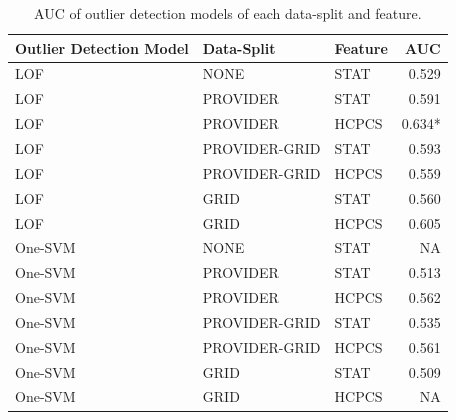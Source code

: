 \documentclass[dvipdfmx, english]{ampmt}             %
\begin{document}
\begin{table}[H]
\centering
  \caption{AUC of outlier detection models of each data-split and feature.}
  \begin{tabular}{lllr} \hline \hline
    Outlier Detection Model & Data-Split & Feature & AUC \\ \hline
    LOF & NONE & STAT &  0.529 \\
    LOF & PROVIDER & STAT &  0.591\\
    LOF & PROVIDER &  HCPCS &  0.634* \\
    LOF & PROVIDER-GRID & STAT & 0.593 \\
    LOF & PROVIDER-GRID & HCPCS &  0.559 \\
    LOF & GRID & STAT & 0.560 \\
    LOF & GRID & HCPCS & 0.605 \\
    One-SVM & NONE &STAT & NA \\
    One-SVM & PROVIDER & STAT &  0.513\\
    One-SVM & PROVIDER & HCPCS & 0.562  \\
    One-SVM & PROVIDER-GRID & STAT & 0.535 \\
    One-SVM & PROVIDER-GRID & HCPCS & 0.561 \\ 
    One-SVM & GRID & STAT & 0.509 \\ 
    One-SVM & GRID & HCPCS & NA \\ \hline
  \end{tabular}
  \label{tb:auc}
  \end{table}
\end{document}
